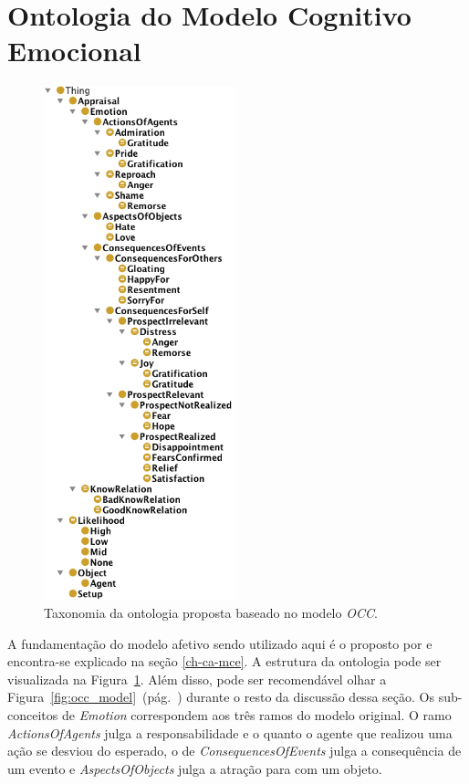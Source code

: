 \section{Ontologia do Modelo Cognitivo Emocional} \label{ch:aec:omce}

\begin{figure}
  \includegraphics[height=149mm]{figuras/hierarquiaLOCC.png}
  \caption{Taxonomia da ontologia proposta baseado no modelo \emph{OCC}.}
  \label{fig:tlocc}
\end{figure}

A fundamentação do modelo afetivo sendo utilizado aqui é o proposto por
\citet{ortony1988cse} e encontra-se explicado na seção \ref{ch-ca-mce}. A
estrutura da ontologia pode ser visualizada na
Figura~\ref{fig:tlocc}. Além disso, pode ser recomendável olhar a
Figura~\ref{fig:occ_model}~(pág.~\pageref{fig:occ_model})
durante o resto da discussão dessa seção. Os sub-conceitos de \emph{Emotion}
correspondem aos três ramos do modelo original.
O ramo \emph{ActionsOfAgents} julga a responsabilidade e o quanto o agente que
realizou uma ação se desviou do esperado, o de
\emph{ConsequencesOfEvents} julga a consequência de um evento e
\emph{AspectsOfObjects} julga a atração para com um objeto.


